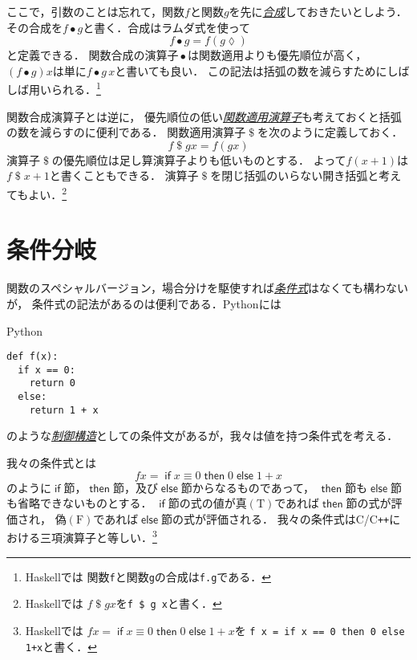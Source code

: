 \documentclass[a5paper,draft]{jsbook}
\newcommand{\programminglanguage}[1]{\textsf{#1}}
\newcommand{\clang}{\programminglanguage{C}}
\newcommand{\cxx}{\programminglanguage{C}\texttt{++}}
\newcommand{\haskell}{\programminglanguage{Haskell}}
\newcommand{\python}{\programminglanguage{Python}}
\newcommand{\keyword}[1]{{\underline{\emph{#1}}}}
\newcommand{\code}[1]{\texttt{#1}}
\newenvironment{pythoncode}{\begin{itembox}[r]{\python}}{\end{itembox}}
\newcommand{\pthnId}[1]{\textit{#1}}
\newcommand{\pthnKeyword}[1]{\textbf{#1}}
\newcommand{\pthnOp}[1]{\texttt{#1}}
\newcommand{\mathConstant}[1]{\mathrm{#1}} %
\newcommand{\mathFalse}{\mathConstant{F}}
\newcommand{\mathTrue}{\mathConstant{T}}
\newcommand{\mathAnonymousParameter}{\lozenge}
\newcommand{\mathBinaryOperator}[1]{\operatorname{#1}}
\newcommand{\mathApply}{\mathBinaryOperator{\$}}
\newcommand{\mathCompose}{\mathBinaryOperator{\bullet}}
\newcommand{\mathKeyword}[1]{\operatorname{\textsf{#1}}}
\newcommand{\mathIf}{\mathKeyword{if}}
\newcommand{\mathThen}{\mathKeyword{then}}
\newcommand{\mathElse}{\mathKeyword{else}}
\begin{document}
ここで，引数のことは忘れて，関数$f$と関数$g$を先に\keyword{合成}しておきたいとしよう．
その合成を$f\mathCompose g$と書く．合成はラムダ式を使って
\begin{equation}
f\mathCompose g=f\left(g\mathAnonymousParameter\right)
\end{equation}
と定義できる．
関数合成の演算子$\mathCompose$は関数適用よりも優先順位が高く，
$\left(f\mathCompose g\right)x$は単に$f\mathCompose g\,x$と書いても良い．
この記法は括弧の数を減らすためにしばしば用いられる．\footnote{\haskell では
関数\code{f}と関数\code{g}の合成は\code{f.g}である．}

関数合成演算子とは逆に，
優先順位の低い\keyword{関数適用演算子}も考えておくと括弧の数を減らすのに便利である．
関数適用演算子$\mathApply$を次のように定義しておく．
\begin{equation}
f\mathApply gx=f\left(gx\right)
\end{equation}
演算子$\mathApply$の優先順位は足し算演算子よりも低いものとする．
よって$f(x+1)$は$f\mathApply x+1$と書くこともできる．
演算子$\mathApply$を閉じ括弧のいらない開き括弧と考えてもよい．\footnote{\haskell では
$f\mathApply gx$を\code{f \$ g x}と書く．}

\section{条件分岐}
\label{sec:if}

関数のスペシャルバージョン，場合分けを駆使すれば\keyword{条件式}はなくても構わないが，
条件式の記法があるのは便利である．\python には
\begin{pythoncode}
\begin{verbatim}
def f(x):
  if x == 0:
    return 0
  else:
    return 1 + x
\end{verbatim}
\end{pythoncode}
のような\keyword{制御構造}としての条件文があるが，我々は値を持つ条件式を考える．

我々の条件式とは
\begin{equation}
fx=\mathIf x\equiv0\mathThen0\mathElse1+x
\end{equation}
のように$\mathIf$節，$\mathThen$節，及び$\mathElse$節からなるものであって，
$\mathThen$節も$\mathElse$節も省略できないものとする．
$\mathIf$節の式の値が真$(\mathTrue)$であれば$\mathThen$節の式が評価され，
偽$(\mathFalse)$であれば$\mathElse$節の式が評価される．
我々の条件式は\clang/\cxx における三項演算子と等しい．\footnote{\haskell では
$fx=\mathIf x\equiv0\mathThen0\mathElse1+x$を
\code{f x = if x == 0 then 0 else 1+x}と書く．}
\end{document}

